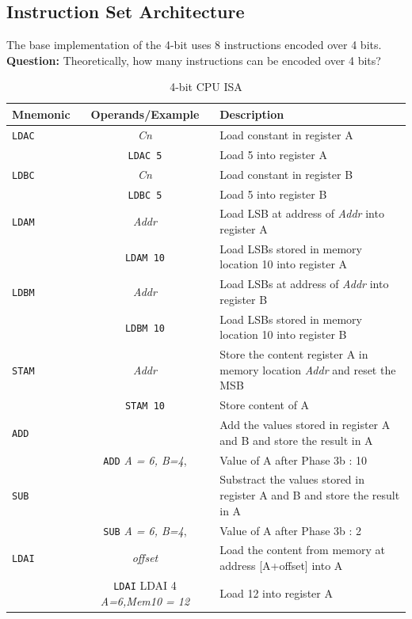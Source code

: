 \documentclass[a4paper, 11pt]{article}
\begin{document}
\subsection{Instruction Set Architecture}
The base implementation of the 4-bit uses 8 instructions encoded over 4 bits. \\
\textbf{Question:} Theoretically, how many instructions can be encoded over 4 bits? \\
\begin{table}[H]
\centering
\begin{tabularx}{\textwidth}{|l c X|}
  \hline

  Mnemonic & Operands/Example & Description \\
  \hline

\verb|LDAC| & \textit{Cn} & Load constant in register A \\
& \verb|LDAC 5| & Load 5 into register A\\
  \hline
  \verb|LDBC| & \textit{Cn} & Load constant in register B \\
& \verb|LDBC 5| & Load 5 into register B\\
  \hline
  \verb|LDAM| & \textit{Addr} & Load LSB at address of \textit{Addr} into register A \\
& \verb|LDAM 10| & Load LSBs stored in memory location 10 into register A\\
  \hline
    \verb|LDBM| & \textit{Addr} & Load LSBs at address of \textit{Addr} into register B \\
& \verb|LDBM 10| & Load LSBs stored in memory location 10 into register B\\
  \hline
  \verb|STAM| & \textit{Addr} & Store the content register A in memory location \textit{Addr} and reset the MSB\\
& \verb|STAM 10| & Store content of A\\
\hline
  \verb|ADD| &  & Add the values stored in register A and B and store the result in A\\
& \verb|ADD| \textit{A = 6, B=4}, & Value of A after Phase 3b : 10\\
\hline
  \verb|SUB| &  & Substract the values stored in register A and B and store the result in A\\
& \verb|SUB| \textit{A = 6, B=4}, & Value of A after Phase 3b : 2\\
\hline
  \verb|LDAI| & \textit{offset} & Load the content from memory at address [A+offset] into A\\
& \verb|LDAI| LDAI 4 \textit{A=6,Mem10 = 12} & Load 12 into register A\\
\hline
\end{tabularx}
 \caption{4-bit CPU ISA}
 \label{Table-3}
 \end{table} 
 
\end{document}
